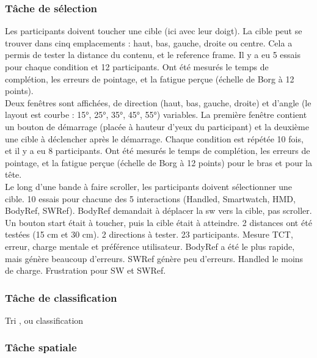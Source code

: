 \subsubsection{Tâche de sélection}
Les participants doivent toucher une cible (ici avec leur doigt). La cible peut se trouver dans cinq emplacements : haut, bas, gauche, droite ou centre. Cela a permis de tester la distance du contenu, et le reference frame. Il y a eu 5 essais pour chaque condition et 12 participants. Ont été mesurés le temps de complétion, les erreurs de pointage, et la fatigue perçue (échelle de Borg à 12 points). \cite{EnsFinneganIrani2014}\\
Deux fenêtres sont affichées, de direction (haut, bas, gauche, droite) et d'angle (le layout est courbe : 15°, 25°, 35°, 45°, 55°) variables. La première fenêtre contient un bouton de démarrage (placée à hauteur d'yeux du participant) et la deuxième une cible à déclencher après le démarrage. Chaque condition est répétée 10 fois, et il y a eu 8 participants. Ont été mesurés le temps de complétion, les erreurs de pointage, et la fatigue perçue (échelle de Borg à 12 points) pour le bras et pour la tête. \cite{EnsFinneganIrani2014}\\
Le long d'une bande à faire scroller, les participants doivent sélectionner une cible. 10 essais pour chacune des 5 interactions (Handled, Smartwatch, HMD, BodyRef, SWRef). BodyRef demandait à déplacer la sw vers la cible, pas scroller. Un bouton start était à toucher, puis la cible était à atteindre. 2 distances ont été testées (15 cm et 30 cm). 2 directions à tester. 23 participants. Mesure TCT, erreur, charge mentale et préférence utilisateur. BodyRef a été le plus rapide, mais génère beaucoup d'erreurs. SWRef génère peu d'erreurs. Handled le moins de charge. Frustration pour SW et SWRef.

\subsubsection{Tâche de classification}
Tri \cite{RobertsonCzerwinskiLarsonEtAl1998}, ou classification \cite{LiuChapuisBeaudouin-LafonEtAl2014}\\

\subsubsection{Tâche spatiale}
\cite{BurigatChittaro2011}
\cite{BergeSerranoPerelmanEtAl2014}

